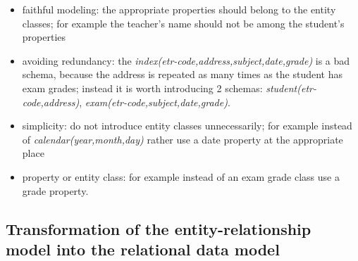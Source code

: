 \documentclass[margin=0px]{article}
\begin{document}
\begin{itemize}
    \item faithful modeling: the appropriate properties should belong to the entity classes; for example the teacher's name should not be among the student's properties
    \item avoiding redundancy: the \textit{index(etr-code,address,subject,date,grade)} is a bad schema,
          because the address is repeated as many times as the student has exam grades; instead it is worth introducing 2 schemas: \textit{student(etr-code,address)}, \textit{exam(etr-code,subject,date,grade)}.
    \item simplicity: do not introduce entity classes unnecessarily; for example instead of \textit{calendar(year,month,day)} rather use a date property at the appropriate place
    \item property or entity class: for example instead of an exam grade class use a grade property.
\end{itemize}

\subsection{Transformation of the entity-relationship model into the relational data model}
\end{document}
